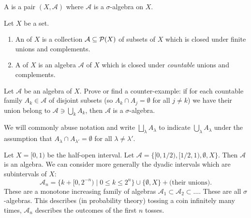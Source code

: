 

\begin{definition}
A  is a pair $(X,\mathcal{A})$ where
$\mathcal{A}$ is a $\sigma$-algebra on $X$.
\end{definition}

\begin{definition}
Let $X$ be a set.
\begin{enumerate}
\item An  of $X$ is a collection
  $\mathcal{A}\subseteq\mathcal{P}(X)$ of subsets of $X$ which is closed
  under finite unions and complements.
\item A  of $X$ is an algebra $\mathcal{A}$
  of $X$ which is closed under \emph{countable} unions and complements.
\end{enumerate}
\end{definition}

\begin{xca}
Let $\mathcal{A}$ be an algebra of $X$.
Prove or find a counter-example: if for each countable family
$A_{k}\in\mathcal{A}$ of disjoint subsets (so $A_{k}\cap A_{j}=\emptyset$ for all $j\neq k$)
we have their union belong to $\mathcal{A}\ni\bigcup_{k}A_{k}$, then
$\mathcal{A}$ is a $\sigma$-algebra.
\end{xca}

\begin{notation}
We will commonly abuse notation and write $\bigsqcup_{\lambda}A_{\lambda}$
to indicate $\bigcup_{\lambda}A_{\lambda}$ under the assumption that
$A_{\lambda}\cap A_{\lambda'}=\emptyset$ for all $\lambda\neq\lambda'$.
\end{notation}

\begin{example}
Let $X=[0,1)$ be the half-open interval.
Let $\mathcal{A}=\{[0,1/2),[1/2,1),\emptyset,X\}$. Then $\mathcal{A}$
    is an algebra.
We can consider more generally the dyadic intervals which are
subintervals of $X$:
\begin{equation}
\mathcal{A}_{n}=\{k+[0,2^{-n})\mid 0\leq k\leq 2^{n}\}\cup\{\emptyset,X\}
+\mbox{(their unions)}.
\end{equation}
These are a monotone increasing family of algebras
$\mathcal{A}_{1}\subset\mathcal{A}_{2}\subset\dots$. These are all
$\sigma$-algebras. This describes (in probability theory) tossing a
coin infinitely many times, $\mathcal{A}_{n}$ describes the outcomes
of the first $n$ tosses.
\end{example}

